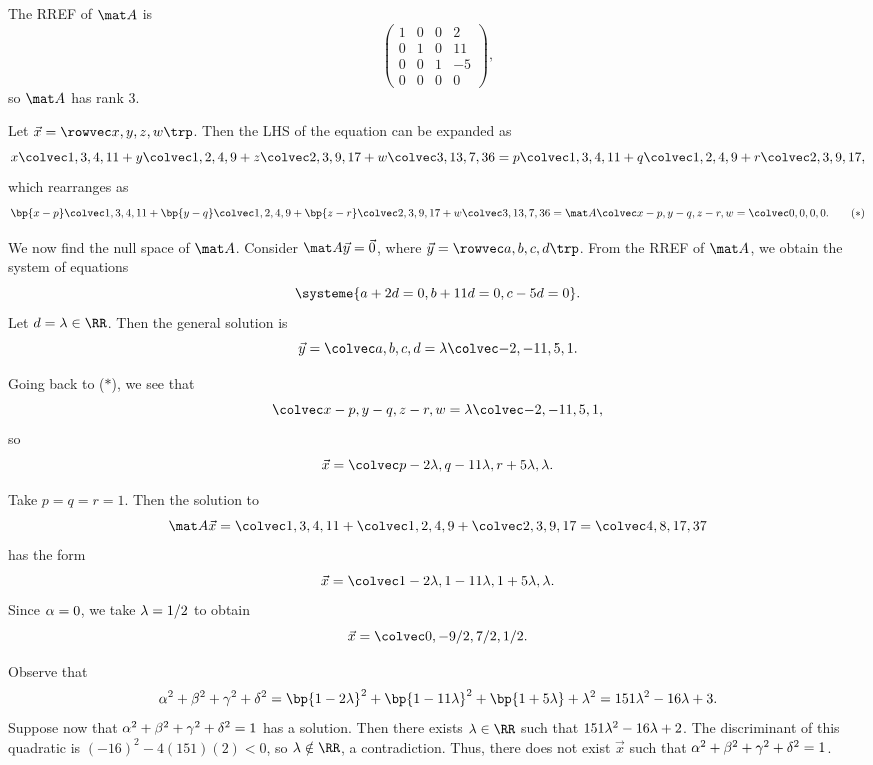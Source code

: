 \begin{solution}
    The RREF of $\mat A$ is \[\begin{pmatrix}1 & 0 & 0 & 2 \\ 0 & 1 & 0 & 11 \\ 0 & 0 & 1 & -5 \\ 0 & 0 & 0 & 0\end{pmatrix},\] so $\mat A$ has rank 3.

    Let $\vec x = \cvecivx{x}{y}{z}{w}$. Then the LHS of the equation can be expanded as \[x \cveciv134{11} + y \cveciv1249 + z \cveciv239{17} + w \cveciv3{13}{7}{36} = p \cveciv134{11} + q \cveciv1249 + r \cveciv239{17},\] which rearranges as \[\bp{x - p}\cveciv134{11} + \bp{y - q} \cveciv1249 + \bp{z - r} \cveciv239{17} + w \cveciv3{13}{7}{36} = \mat A \cveciv{x-p}{y-q}{z-r}{w} = \cveciv0000. \tag{$\ast$}\]
    
    We now find the null space of $\mat A$. Consider $\mat A \vec y = \vec 0$, where $\vec y = \cvecivx{a}{b}{c}{d}$. From the RREF of $\mat A$, we obtain the system of equations \[\systeme{a + 2d = 0, b + 11d = 0, c - 5d = 0}.\] Let $d = \l \in \RR$. Then the general solution is \[\vec y = \cveciv{a}{b}{c}{d} = \l \cveciv{-2}{-11}{5}{1}.\]

    Going back to ($\ast$), we see that \[\cveciv{x-p}{y-q}{z-r}{w} = \l \cveciv{-2}{-11}{5}{1},\] so \[\vec x = \cveciv{p - 2\l}{q-11\l}{r+5\l}{\l}.\]

    \begin{ppart}
        Take $p = q = r = 1$. Then the solution to \[\mat A \vec x = \cveciv134{11} + \cveciv1249 + \cveciv239{17} = \cveciv48{17}{37}\] has the form \[\vec x = \cveciv{1 - 2\l}{1-11\l}{1+5\l}{\l}.\] Since $\alpha = 0$, we take $\lambda = 1/2$ to obtain \[\vec x = \cveciv0{-9/2}{7/2}{1/2}.\]
    \end{ppart}
    \begin{ppart}
        Observe that \[\a^2 + \b^2 + \g^2 + \de^2 = \bp{1 - 2\l}^2 + \bp{1 - 11\l}^2 + \bp{1 + 5\l} + \l^2 = 151\l^2 - 16\l + 3.\] Suppose now that $\alpha^2 + \beta^2 + \gamma^2 + \delta^2 = 1$ has a solution. Then there exists $\l \in \RR$ such that $151\lambda^2 - 16\lambda + 2$. The discriminant of this quadratic is $(-16)^2 - 4(151)(2) < 0$, so $\l \notin \RR$, a contradiction. Thus, there does not exist $\vec x$ such that $\alpha^2 + \beta^2 + \gamma^2 + \delta^2 = 1$.
    \end{ppart}
\end{solution}


